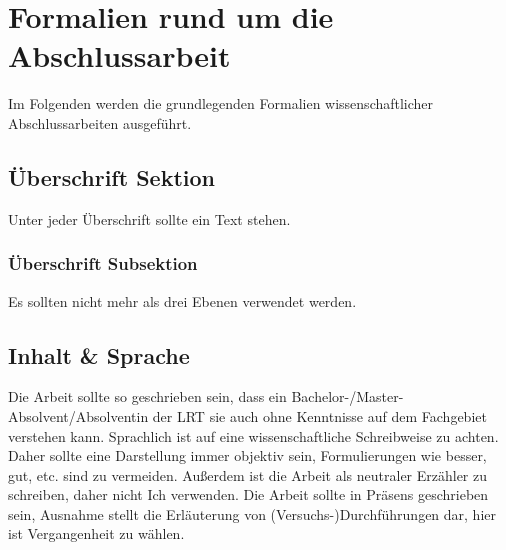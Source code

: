 \newpage
\chapter{Formalien rund um die Abschlussarbeit}
Im Folgenden werden die grundlegenden Formalien wissenschaftlicher Abschlussarbeiten ausgeführt.

\section{Überschrift Sektion}
\label{sec:ueberschrift_sektion}
Unter jeder Überschrift sollte ein Text stehen.
\subsection{Überschrift Subsektion}
\label{subsec:ueberschrift_subsektion}
Es sollten nicht mehr als drei Ebenen verwendet werden.

\section{Inhalt \& Sprache}
\label{subsec:inhalt_sprache}
Die Arbeit sollte so geschrieben sein, dass ein Bachelor-/Master-Absolvent/Absolventin der LRT sie auch ohne Kenntnisse auf dem Fachgebiet verstehen kann. Sprachlich ist auf eine wissenschaftliche Schreibweise zu achten. Daher sollte eine Darstellung immer objektiv sein, Formulierungen wie \glqq besser\grqq{}, \glqq gut\grqq{}, etc. sind zu vermeiden. Außerdem ist die Arbeit als neutraler Erzähler zu schreiben, daher nicht \glqq Ich\grqq{} verwenden. Die Arbeit sollte in Präsens geschrieben sein, Ausnahme stellt die Erläuterung von (Versuchs-)Durchführungen dar, hier ist Vergangenheit zu wählen.


